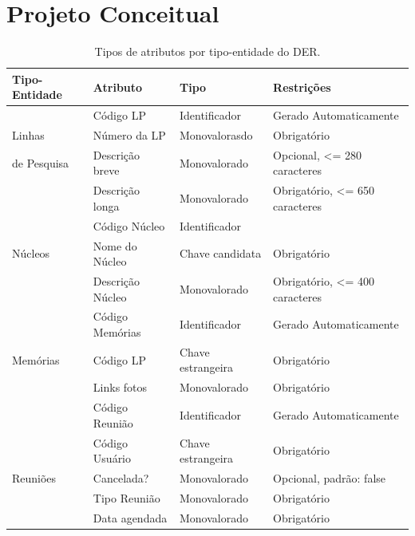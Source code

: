 \documentclass[11pt]{../../classes/ifscarticle}
\begin{document}
\section{Projeto Conceitual}

\begin{table}[h]
    \centering
    \vspace{0.5cm}
    \begin{tabular}{ |p{}|p{3cm}|p{4cm}|p{}|  }
      \hline
      Tipo-Entidade & Atributo & Tipo & Restrições \\ %
     
                                             
      \hline
                    & Código LP       & Identificador     & Gerado Automaticamente         \\
    Linhas          & Número da LP    & Monovalorasdo      & Obrigatório                    \\
    de Pesquisa       & Descrição breve & Monovalorado      & Opcional, <= 280 caracteres    \\
                     & Descrição longa & Monovalorado      & Obrigatório, <= 650 caracteres \\
                   
      \hline
                    & Código Núcleo       & Identificador     &         \\
      Núcleos       & Nome do Núcleo      & Chave candidata   & Obrigatório                    \\
                    & Descrição Núcleo & Monovalorado      & Obrigatório, <= 400 caracteres \\
      \hline
                    & Código Memórias     & Identificador     & Gerado Automaticamente \\
     Memórias       & Código LP           & Chave estrangeira & Obrigatório            \\  
                    & Links fotos         & Monovalorado      & Obrigatório            \\
      \hline 
                    & Código Reunião      & Identificador     & Gerado Automaticamente  \\
                    & Código Usuário      & Chave estrangeira & Obrigatório             \\
     Reuniões       & Cancelada?          & Monovalorado      & Opcional, padrão: false \\
                    & Tipo Reunião        & Monovalorado      & Obrigatório             \\
                    & Data agendada       & Monovalorado      & Obrigatório             \\
      \hline
    \end{tabular}
    \caption{Tipos de atributos por tipo-entidade do DER.}
  \end{table}
\end{document}
